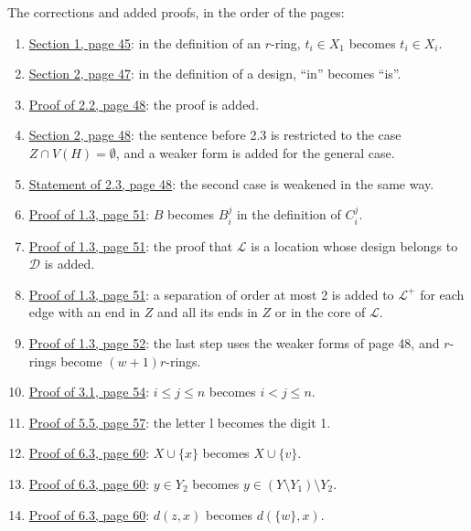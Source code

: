 The corrections and added proofs, in the order of the pages:
\begin{enumerate}\setlength{\itemsep}{1pt}
\item {}\hyperref[fix:r-ring]{Section 1, page 45}: in the definition of an $r$-ring,
$t_i \in X_1$ becomes $t_i \in X_i$.
\item {}\hyperref[fix:design]{Section 2, page 47}: in the definition of a design, ``in'' becomes
``is''.
\item {}\hyperref[fix:2.2-proof-added]{Proof of 2.2, page 48}: the proof is added.
\item {}\hyperref[fix:2-torso]{Section 2, page 48}: the sentence before 2.3 is restricted to the
case $Z \cap V(H) = \emptyset$, and a weaker form is added for the general case.
\item {}\hyperref[fix:2.3]{Statement of 2.3, page 48}: the second case is weakened in the same
way.
\item {}\hyperref[fix:1.3-Cij]{Proof of 1.3, page 51}: $B$ becomes $B_i^j$ in the definition of
$C_i^j$.
\item {}\hyperref[fix:1.3-location-proof-added]{Proof of 1.3, page 51}: the proof that
$\mathcal{L}$ is a location whose design belongs to $\mathcal{D}$ is added.
\item {}\hyperref[fix:1.3-location]{Proof of 1.3, page 51}: a separation of order at most 2 is
added to $\mathcal{L}^+$ for each edge with an end in $Z$ and all its ends in $Z$ or in the core
of $\mathcal{L}$.
\item {}\hyperref[fix:1.3-proof]{Proof of 1.3, page 52}: the last step uses the weaker forms of
page 48, and $r$-rings become $(w + 1)r$-rings.
\item {}\hyperref[fix:3.1-proof]{Proof of 3.1, page 54}: $i \le j \le n$ becomes $i < j \le n$.
\item {}\hyperref[fix:5.5-proof]{Proof of 5.5, page 57}: the letter l becomes the digit 1.
\item {}\hyperref[fix:6.3-animal]{Proof of 6.3, page 60}: $X \cup \{x\}$ becomes
$X \cup \{v\}$.
\item {}\hyperref[fix:6.3-Y2]{Proof of 6.3, page 60}: $y \in Y_2$ becomes
$y \in (Y \setminus Y_1) \setminus Y_2$.
\item {}\hyperref[fix:6.3-zone]{Proof of 6.3, page 60}: $d(z, x)$ becomes $d(\{w\}, x)$.

\end{enumerate}
